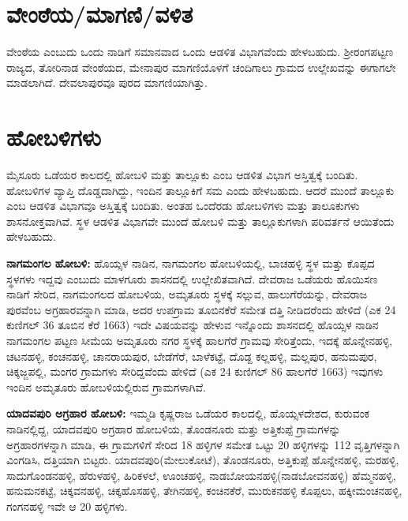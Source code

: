 \section*{ವೇಂಠೆಯ/ಮಾಗಣಿ/ವಳಿತ}

ವೇಂಠೆಯ ಎಂಬುದು ಒಂದು ನಾಡಿಗೆ ಸಮಾನವಾದ ಒಂದು ಆಡಳಿತ ವಿಭಾಗವೆಂದು ಹೇಳಬಹುದು. ಶ‍್ರೀರಂಗಪಟ್ಟಣ ರಾಜ್ಯದ, ತೋರಿನಾಡ ವೇಂಠೆಯದ, ಮೇನಾಪುರ ಮಾಗಣಿಯೊಳಗೆ ಚಂದಿಗಾಲು ಗ್ರಾಮದ ಉಲ್ಲೇಖವನ್ನು ಈಗಾಗಲೇ ಮಾಡಲಾಗಿದೆ. ದೇವಲಾಪುರವೂ ಪುರದ ಮಾಗಣಿಯಾಗಿತ್ತು.


\section*{ಹೋಬಳಿಗಳು}

ಮೈಸೂರು ಒಡೆಯರ ಕಾಲದಲ್ಲಿ ಹೋಬಳಿ ಮತ್ತು ತಾಲ್ಲೂಕು ಎಂಬ ಆಡಳಿತ ವಿಭಾಗ ಅಸ್ತಿತ್ವಕ್ಕೆ ಬಂದಿತು. ಹೋಬಳಿಗಳ ವ್ಯಾಪ್ತಿ ದೊಡ್ಡದಾಗಿದ್ದು, ಇಂದಿನ ತಾಲ್ಲೂಕಿಗೆ ಸಮ ಎಂದು ಹೇಳಬಹುದು. ಆದರೆ ಮುಂದೆ ತಾಲ್ಲೂಕು ಎಂಬ ಆಡಳಿತ ವಿಭಾಗವೂ ಅಸ್ತಿತ್ವಕ್ಕೆ ಬಂದಿತು. ಅಂತಹ ಒಂದೆರಡು ಹೋಬಳಿಗಳು ಮತ್ತು ತಾಲೂಕುಗಳು ಶಾಸನೋಕ್ತವಾಗಿವೆ. ಸ್ಥಳ ಆಡಳಿತ ವಿಭಾಗವೇ ಮುಂದೆ ಹೋಬಳಿ ಮತ್ತು ತಾಲ್ಲೂಕುಗಳಾಗಿ ಪರಿವರ್ತನೆ ಆಯಿತೆಂದು ಹೇಳಬಹುದು.

\textbf{ನಾಗಮಂಗಲ ಹೋಬಳಿ:} ಹೊಯ್ಸಳ ನಾಡಿನ, ನಾಗಮಂಗಲ ಹೋಬಳಿಯಲ್ಲಿ, ಬಾಚಹಳ್ಳಿ ಸ್ಥಳ ಮತ್ತು ಕೊಪ್ಪದ ಸ್ಥಳಗಳು ಇದ್ದವು ಎಂಬುದು ಮಾಳಗೂರು ಶಾಸನದಲ್ಲಿ ಉಲ್ಲೇಖಿತವಾಗಿದೆ. ದೇವರಾಜ ಒಡೆಯರು ಹೊಯಿಸಣ ನಾಡಿಗೆ ಸೇರಿದ, ನಾಗಮಂಗಲದ ಹೋಬಳಿಯ, ಅಮೃತೂರು ಸ್ಥಳಕ್ಕೆ ಸಲ್ಲುವ, ಹಾಲುಗೆರೆಯನ್ನು, ದೇವರಾಜ ಪುರವೆಂಬ ಅಗ್ರಹಾರವನ್ನಾಗಿ ಮಾಡಿ, ಅದರ ಉಪಗ್ರಾಮ ತೂಬಿನಕೆರೆ ಸಮೇತ ದತ್ತಿ ನೀಡಿದರೆಂದು ಹೇಳಿದೆ (ಎಕ 24 ಕುಣಿಗಲ್ 36 ತೂಬಿನ ಕೆರೆ 1663) ಇದೇ ವಿಷಯವನ್ನು ಹೇಳುವ ಇನ್ನೊಂದು ಶಾಸನದಲ್ಲಿ ಹೊಯ್ಸಳ ನಾಡಿನ ನಾಗಮಂಗಲ ಪಟ್ಟಣ ಸೀಮೆಯ ಅಮೃತೂರು ನಗರ ಸ್ಥಳಕ್ಕೆ ಹಾಲಗೆರೆ ಗ್ರಾಮವು ಸೇರಿತ್ತೆಂದು, ಇದಕ್ಕೆ ಹೊನ್ನೇನಹಳ್ಳಿ, ಚಟನಹಳ್ಳಿ, ಕಂಚನಹಳ್ಳಿ, ಚಾನರಾಯಪುರ, ಬೇಡೆಗೆರೆ, ಬಾಳೆಕಟ್ಟೆ, ದೊಡ್ದ ಕಲ್ಲಹಳ್ಳಿ, ಮಲ್ಲಪುರ, ಹನುಮಪುರ, ಚಿಕ್ಕಜ್ಜಪಲ್ಲಿ, ಮಂಗರ ಗ್ರಾಮಗಳು ಸೇರಿದ್ದವೆಂದು ಹೇಳಿದೆ (ಎಕ 24 ಕುಣಿಗಲ್ 86 ಹಾಲಗೆರೆ 1663) ಇವುಗಳು ಇಂದಿನ ಅಮೃತೂರು ಹೋಬಳಿಯಲ್ಲಿರುವ ಗ್ರಾಮಗಳಾಗಿವೆ.


\textbf{ಯಾದವಪುರಿ ಅಗ್ರಹಾರ ಹೋಬಳಿ:} ಇಮ್ಮಡಿ ಕೃಷ್ಣರಾಜ ಒಡೆಯರ ಕಾಲದಲ್ಲಿ, ಹೊಯ್ಸಳದೇಶದ, ಕುರುವಂಕ ನಾಡಿನಲ್ಲಿದ್ದ, ಯಾದವಪುರಿ ಅಗ್ರಹಾರ ಹೋಬಳಿಯ, ತೊಂಡನೂರು ಮತ್ತು ಅತ್ತಿಕುಪ್ಪೆ ಗ್ರಾಮಗಳನ್ನು ಅಗ್ರಹಾರಗಳನ್ನಾಗಿ ಮಾಡಿ, ಈ ಗ್ರಾಮಗಳಿಗೆ ಸೇರಿದ 18 ಹಳ್ಳಿಗಳ ಸಮೇತ ಒಟ್ಟು 20 ಹಳ್ಳಿಗಳನ್ನು 112 ವೃತ್ತಿಗಳನ್ನಾಗಿ ವಿಂಗಡಿಸಿ, ದತ್ತಿಯಾಗಿ ಬಿಟ್ಟರು. ಯಾದವಪುರಿ(ಮೇಲುಕೋಟೆ), ತೊಂಡನೂರು, ಅತ್ತಿಕುಪ್ಪೆ ಹೊನ್ನೇನಹಳ್ಳಿ, ಮರಹಳ್ಳಿ, ಸಾದುಗೊಂಡನಹಳ್ಳಿ, ಹೆರುಳಹಳ್ಳಿ, ಹಿರಿಕಳಲೆ, ಊಂಚಹಳ್ಳಿ, ನಾಡಬೋಯನಹಳ್ಳಿ(ನಾಡಬೋವನಹಳ್ಳಿ) ಹೆಮ್ಮನಹಳ್ಳಿ, ಹನುಮನಕಟ್ಟೆ, ಚಿಕ್ಕವನಹಳ್ಳಿ, ಚಿಕ್ಕಹೊಸಹಳ್ಳಿ, ತೇಗಿನಹಳ್ಳಿ, ಕಂಚಿನಕೆರೆ, ಮುರುಕನಹಳ್ಳಿ ಕೊಪ್ಪಲು, ಹಕ್ಕೀಮಂಚನಹಳ್ಳಿ, ಗಂಗನಹಳ್ಳಿ ಇವೇ ಆ 20 ಹಳ್ಳಿಗಳು.

